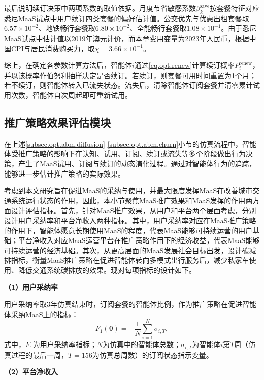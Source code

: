 最后说明续订决策中两项系数的取值依据。月度节省敏感系数$\beta_{k}^{\mathrm{save}}$按套餐特征对应悉尼MaaS试点中用户续订四类套餐的偏好估计值。公交优先与优惠出租套餐取$6.57\times10^{-2}$、地铁畅行套餐取$6.80\times10^{-2}$、全能畅行套餐取$1.08\times10^{-1}$\citep{hoDriversParticipantsChoices2021}。由于悉尼MaaS试点中估计值以2019年澳元计价，而本章费用变量为2023年人民币，根据中国CPI与居民消费购买力，取$\chi=3.66\times10^{-1}$。

综上，在确定各参数计算方法后，智能体$i$通过\eqref{eq.opt.renew}计算续订概率$P_{i}^{\mathrm{renew}}$，并以该概率作伯努利抽样决定是否续订。若续订，则套餐可用时间重置为1个月；若不续订，则智能体转入已流失状态。流失后，清除智能体订阅套餐并清零累计试用次数，智能体自次周起即可重新试用。

\subsection{推广策略效果评估模块}\label{subsec.opt.abm.objective}

在上述\ref{subsec.opt.abm.diffusion}-\ref{subsec.opt.abm.churn}小节的仿真流程中，智能体受推广策略的影响下在认知、试用、订阅、续订或流失等多个阶段做出行为决策，产生了MaaS试用、订阅与续订的动态演化过程。通过对智能体行为的追踪，能够进一步估计推广策略的实际效果。

考虑到本文研究旨在促进MaaS的采纳与使用，并最大限度发挥MaaS在改善城市交通系统运行状态的作用，因此，本小节聚焦MaaS推广效果和MaaS发挥的作用两方面设计评估指标。首先，针对MaaS推广效果，从用户和平台两个层面考虑，分别设计用户采纳率和平台净收入两种指标。其中，用户采纳率对应在MaaS推广策略的作用下，智能体愿意长期使用MaaS的程度，代表MaaS能够可持续运营的用户基础；平台净收入对应MaaS运营平台在推广策略作用下的经济收益，代表MaaS能够可持续运营的经济基础。其次，从更高层面的MaaS发展社会目标出发，设计碳减排指标，衡量MaaS推广策略在促进智能体转向多模式出行服务后，减少私家车使用、降低交通系统碳排放的效果。现对每项指标的设计如下。

\textbf{（1）用户采纳率}

用户采纳率取3年仿真结束时，订阅套餐的智能体比例，作为推广策略在促进智能体采纳MaaS上的指标：
\begin{equation}
F_{1}(\bm{\theta}) = -\frac{1}{N}\sum_{i=1}^{N}\sigma_{i,T},
\label{eq.opt.objadopt}
\end{equation}
式中，$F_{1}$为用户采纳率指标；$N$为仿真中的智能体总数；$\sigma_{i,T}$为智能体$i$第$T$周（仿真过程的最后一周，$T=156$为仿真总周数）的订阅状态指示变量。

\textbf{（2）平台净收入}

